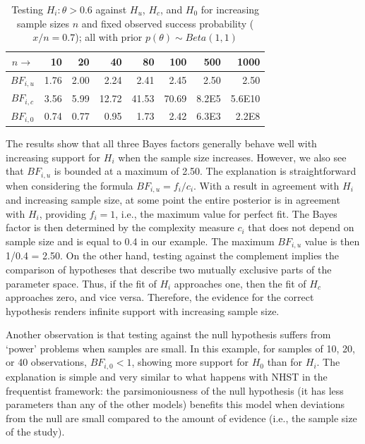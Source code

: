 \documentclass[11pt,reqno]{article}
\begin{document}
\begin{table}[!h]
\caption{Testing $H_i: \theta>0.6$ against $H_u$, $H_c$, and $H_0$ for increasing sample sizes $n$ and fixed observed success probability ($x/n=0.7$); all with prior $p(\theta)\sim Beta(1,1)$}
\label{Neffect}
  \centering
     \begin{tabular}{crrrrrrr}\hline
$n \rightarrow$  & 10    & 20    & 40   & 80   & 100  & 500  & 1000  \\ \hline
 $BF_{i,u}$  & 1.76  & 2.00  & 2.24 & 2.41 & 2.45 & 2.50 & 2.50  \\
 $BF_{i,c}$  & 3.56  & 5.99  & 12.72& 41.53& 70.69& 8.2E5  & 5.6E10   \\
 $BF_{i,0}$  & 0.74  & 0.77  & 0.95 & 1.73 & 2.42 & 6.3E3  & 2.2E8   \\ \hline
\end{tabular}
\end{table}

The results show that all three Bayes factors generally behave well with increasing support for $H_i$ when the sample size increases. However, we also see that $BF_{i,u}$ is bounded at a maximum of 2.50. The explanation is straightforward when considering the formula $BF_{i,u}=f_i/c_i$. With a result in agreement with $H_i$ and increasing sample size, at some point the entire posterior is in agreement with $H_i$, providing $f_i=1$, i.e., the maximum value for perfect fit. The Bayes factor is then determined by the complexity measure $c_i$ that does not depend on sample size and is equal to 0.4 in our example. The maximum $BF_{i,u}$ value is then 1/0.4 = 2.50. On the other hand, testing against the complement implies the comparison of hypotheses that describe two mutually exclusive parts of the parameter space. Thus, if the fit of $H_i$ approaches one, then the fit of $H_c$ approaches zero, and vice versa. Therefore, the evidence for the correct hypothesis renders infinite support with increasing sample size.

Another observation is that testing against the null hypothesis suffers from `power' problems when samples are small. In this example, for samples of 10, 20, or 40 observations, $BF_{i,0} < 1$, showing more support for $H_0$ than for $H_i$. The explanation is simple and very similar to what happens with NHST in the frequentist framework: the parsimoniousness of the null hypothesis (it has less parameters than any of the other models) benefits this model when deviations from the null are small compared to the amount of evidence (i.e., the sample size of the study).
\end{document}
